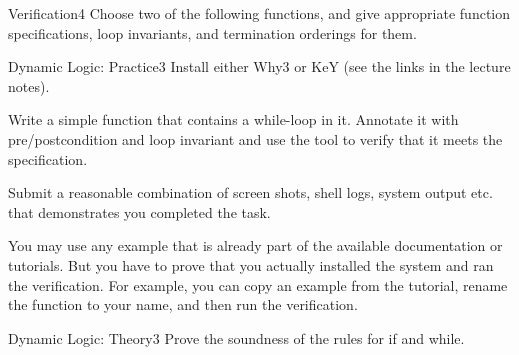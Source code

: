 \documentclass[a4paper]{article}
\begin{document}
\header

\begin{problem}{Verification}{4}
Choose two of the following functions, and give appropriate function specifications, loop invariants, and termination orderings for them.

\begin{acode}
\end{acode}

\begin{acode}
\end{acode}

\begin{acode}
\end{acode}

\begin{acode}
\end{acode}
\end{problem}


\begin{problem}{Dynamic Logic: Practice}{3}
Install either Why3 or KeY (see the links in the lecture notes).

Write a simple function that contains a while-loop in it.
Annotate it with pre/postcondition and loop invariant and use the tool to verify that it meets the specification.
\medskip

Submit a reasonable combination of screen shots, shell logs, system output etc. that demonstrates you completed the task.

You may use any example that is already part of the available documentation or tutorials.
But you have to prove that you actually installed the system and ran the verification.
For example, you can copy an example from the tutorial, rename the function to your name, and then run the verification.
\end{problem}

\begin{problem}{Dynamic Logic: Theory}{3}
Prove the soundness of the rules for if and while.
\end{problem}
\end{document}
